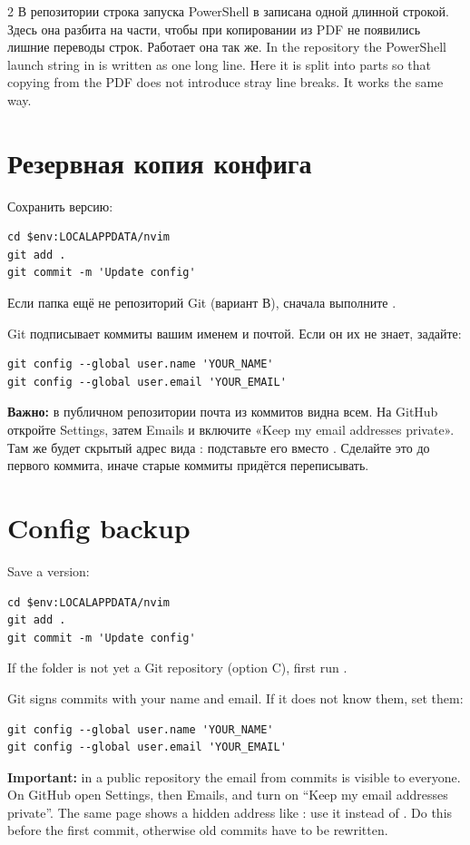 \begin{paracol}{2}
\RU
В репозитории строка запуска PowerShell в  записана одной длинной строкой. Здесь она разбита на части, чтобы при копировании из PDF не появились лишние переводы строк. Работает она так же.
\switchcolumn
\EN
In the repository the PowerShell launch string in  is written as one long line. Here it is split into parts so that copying from the PDF does not introduce stray line breaks. It works the same way.
\switchcolumn*

\RU
\section*{Резервная копия конфига}
Сохранить версию:
\begin{lstlisting}
cd $env:LOCALAPPDATA/nvim
git add .
git commit -m 'Update config'
\end{lstlisting}
Если папка ещё не репозиторий Git (вариант В), сначала выполните .

Git подписывает коммиты вашим именем и почтой. Если он их не знает, задайте:
\begin{lstlisting}
git config --global user.name 'YOUR_NAME'
git config --global user.email 'YOUR_EMAIL'
\end{lstlisting}
\textbf{Важно:} в публичном репозитории почта из коммитов видна всем. На GitHub откройте Settings, затем Emails и включите «Keep my email addresses private». Там же будет скрытый адрес вида : подставьте его вместо . Сделайте это до первого коммита, иначе старые коммиты придётся переписывать.
\switchcolumn
\EN
\section*{Config backup}
Save a version:
\begin{lstlisting}
cd $env:LOCALAPPDATA/nvim
git add .
git commit -m 'Update config'
\end{lstlisting}
If the folder is not yet a Git repository (option C), first run .

Git signs commits with your name and email. If it does not know them, set them:
\begin{lstlisting}
git config --global user.name 'YOUR_NAME'
git config --global user.email 'YOUR_EMAIL'
\end{lstlisting}
\textbf{Important:} in a public repository the email from commits is visible to everyone. On GitHub open Settings, then Emails, and turn on ``Keep my email addresses private''. The same page shows a hidden address like : use it instead of . Do this before the first commit, otherwise old commits have to be rewritten.
\switchcolumn*


\end{paracol}
